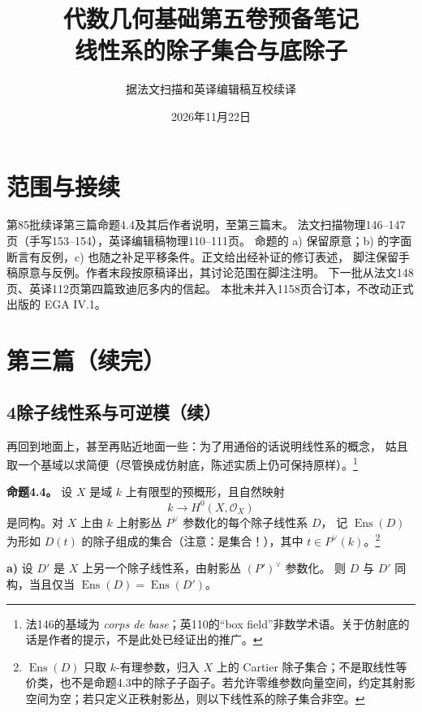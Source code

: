 \documentclass[openany,fontset=fandol]{ctexbook}
\DeclareMathOperator{\Ens}{Ens}
\newcommand{\OO}{\mathcal O}
\begin{document}
\title{代数几何基础第五卷预备笔记\\线性系的除子集合与底除子}
\author{据法文扫描和英译编辑稿互校续译}
\date{2026年11月22日}
\maketitle
\chapter*{范围与接续}
第85批续译第三篇命题4.4及其后作者说明，至第三篇末。
法文扫描物理146--147页（手写153--154），英译编辑稿物理110--111页。
命题的 a) 保留原意；b) 的字面断言有反例，c) 也随之补足平移条件。正文给出经补证的修订表述，
脚注保留手稿原意与反例。作者末段按原稿译出，其讨论范围在脚注注明。
下一批从法文148页、英译112页第四篇致迪厄多内的信起。
本批未并入1158页合订本，不改动正式出版的 EGA IV.1。

\chapter*{第三篇（续完）}
\section*{4\quad 除子线性系与可逆模（续）}
再回到地面上，甚至再贴近地面一些：为了用通俗的话说明线性系的概念，
姑且取一个基域以求简便（尽管换成仿射底，陈述实质上仍可保持原样）。\footnote{法146的基域为 \emph{corps de base}；英110的“box field”非数学术语。关于仿射底的话是作者的提示，不是此处已经证出的推广。}

\medskip\noindent\textbf{命题4.4。}
设 \(X\) 是域 \(k\) 上有限型的预概形，且自然映射
\[
 k\longrightarrow H^0(X,\OO_X)
\]
是同构。对 \(X\) 上由 \(k\) 上射影丛 \(P^\vee\) 参数化的每个除子线性系 \(D\)，
记 \(\Ens(D)\) 为形如 \(D(t)\) 的除子组成的集合（注意：是集合！），其中
\(t\in P^\vee(k)\)。\footnote{\(\Ens(D)\) 只取 \(k\)-有理参数，归入 \(X\) 上的 Cartier 除子集合；不是取线性等价类，也不是命题4.3中的除子子函子。若允许零维参数向量空间，约定其射影空间为空；若只定义正秩射影丛，则以下线性系的除子集合非空。}

\smallskip\noindent\textbf{a)}
设 \(D'\) 是 \(X\) 上另一个除子线性系，由射影丛 \((P')^\vee\) 参数化。
则 \(D\) 与 \(D'\) 同构，当且仅当 \(\Ens(D)=\Ens(D')\)。
\end{document}
